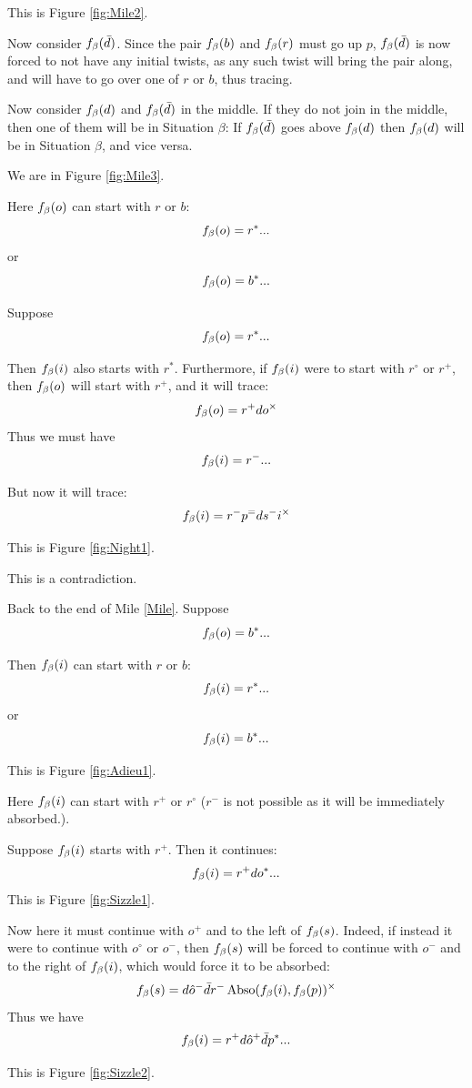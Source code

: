 This is Figure \ref{fig:Mile2}.

Now consider $f_\beta(\bar{d})$. Since the pair $f_\beta(b)$ and $f_\beta(r)$ must go up $p$, $f_\beta(\bar{d})$ is now forced to not have any initial twists, as any such twist will bring the pair along, and will have to go over one of $r$ or $b$, thus tracing.

Now consider $f_\beta(d)$ and $f_\beta(\bar{d})$ in the middle. If they do not join in the middle, then one of them will be in Situation $\beta$: If $f_\beta(\bar{d})$ goes above $f_\beta(d)$ then $f_\beta(d)$ will be in Situation $\beta$, and vice versa. 

We are in Figure \ref{fig:Mile3}.

Here $f_\beta(o)$ can start with $r$ or $b$:
\[
f_\beta(o) = r^*...
\]
or
\[
f_\beta(o) = b^*...
\]

\label{Night}
Suppose
\[
f_\beta(o) = r^*...
\]

Then $f_\beta(i)$ also starts with $r^*$. Furthermore, if $f_\beta(i)$ were to start with $r^\circ$ or $r^+$, then $f_\beta(o)$ will start with $r^+$, and it will trace:
\[
f_\beta(o) = r^+ d o^\times
\]
Thus we must have
\[
f_\beta(i) = r^-...
\]

But now it will trace:
\[
f_\beta(i) = r^- p^= d s^- i^\times
\]

This is Figure \ref{fig:Night1}.

This is a contradiction.

 \label{Shade}
Back to the end of Mile \ref{Mile}. Suppose
\[
f_\beta(o) = b^*...
\]

Then $f_\beta(i)$ can start with $r$ or $b$:
\[
f_\beta(i) = r^*...
\]
or
\[
f_\beta(i) = b^*...
\]

 \label{Adieu}
This is Figure \ref{fig:Adieu1}.

Here $f_\beta(i)$ can start with $r^+$ or $r^\circ$ ($r^-$ is not possible as it will be immediately absorbed.).

\label{Sizzle}
Suppose $f_\beta(i)$ starts with $r^+$. Then it continues:
\[
f_\beta(i) = r^+ d o^*...
\]
This is Figure \ref{fig:Sizzle1}.

Now here it must continue with $o^+$ and to the left of $f_\beta(s)$. Indeed, if instead it were to continue with $o^\circ$ or $o^-$, then $f_\beta(s)$ will be forced to continue with $o^-$ and to the right of $f_\beta(i)$, which would force it to be absorbed:
\[
f_\beta(s) = d \hat{o}^- \bar{d} r^- \operatorname{Abso}(f_\beta(i), f_\beta(p))^\times
\]
Thus we have
\[
f_\beta(i) = r^+ d \hat{o}^+ \bar{d} p^*...
\]

This is Figure \ref{fig:Sizzle2}.

